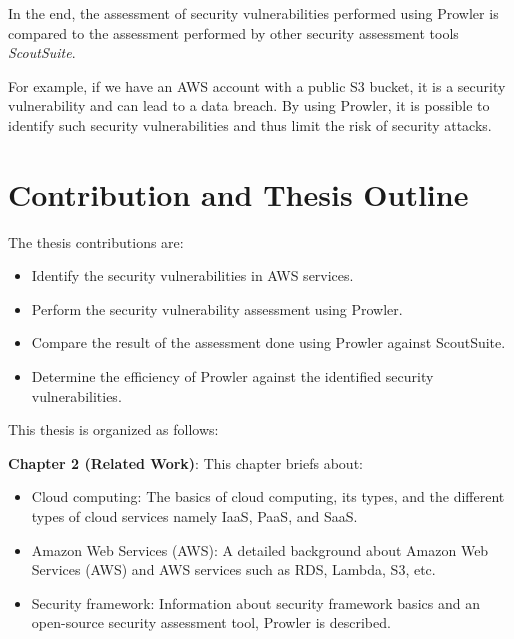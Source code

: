 \par In the end, the assessment of security vulnerabilities performed using Prowler is compared to the assessment performed by other security assessment tools \textit{ScoutSuite}.

\par For example, if we have an AWS account with a public S3 bucket, it is a security vulnerability and can lead to a data breach.
By using Prowler, it is possible to identify such security vulnerabilities and thus limit the risk of security attacks.

\section{Contribution and Thesis Outline}
\par The thesis contributions are:
\begin{itemize}
    \item Identify the security vulnerabilities in AWS services.
\end{itemize}
\begin{itemize}
    \item Perform the security vulnerability assessment using Prowler.
\end{itemize}
\begin{itemize}
    \item Compare the result of the assessment done using Prowler against ScoutSuite.
\end{itemize}
\begin{itemize}
    \item Determine the efficiency of Prowler against the identified security vulnerabilities.
\end{itemize}

\par This thesis is organized as follows:
\par \textbf{Chapter 2 (Related Work)}: This chapter briefs about:
\begin{itemize}
    \item Cloud computing: The basics of cloud computing,
    its types, and the different types of cloud services
    namely IaaS, PaaS, and SaaS.
\end{itemize}
\begin{itemize}
    \item Amazon Web Services (AWS): A detailed
    background about Amazon Web Services (AWS) and AWS
    services such as RDS, Lambda, S3, etc.
\end{itemize}
\begin{itemize}
    \item Security framework: Information about security
    framework basics and an open-source security assessment tool, Prowler is described.
\end{itemize}

